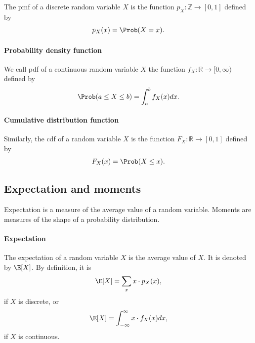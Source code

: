 The \gls{pmf} of a discrete random variable $X$ is the
function $p_X : \mathbb{Z} \rightarrow [0, 1]$ defined by
\begin{equation}
  \label{eq:pmf}
  p_X(x) = \Prob(X = x)\text{.}
\end{equation}

\paragraph{Probability density function}

We call \gls{pdf} of a continuous random variable $X$ the
function $f_X : \mathbb{R} \rightarrow [0, \infty)$ defined by
\begin{equation}
  \label{eq:pdf}
  \Prob(a \leq X \leq b) = \int_a^b f_X(x) dx\text{.}
\end{equation}

\paragraph{Cumulative distribution function}

Similarly, the \gls{cdf} of a random variable $X$ is the function
$F_X : \mathbb{R} \rightarrow [0, 1]$ defined by
\begin{equation}
  \label{eq:cdf}
  F_X(x) = \Prob(X \leq x)\text{.}
\end{equation}

\subsection{Expectation and moments}

Expectation is a measure of the average value of a random variable.  Moments are
measures of the shape of a probability distribution.

\paragraph{Expectation}  The expectation of a random variable $X$ is the average
value of $X$.  It is denoted by $\E[X]$.  By definition, it is
\begin{equation*}
  \E[X] = \sum_{x} x \cdot p_X(x)\text{,}
\end{equation*}
if $X$ is discrete, or
\begin{equation*}
  \E[X] = \int_{-\infty}^{\infty} x \cdot f_X(x) dx\text{,}
\end{equation*}
if $X$ is continuous.

